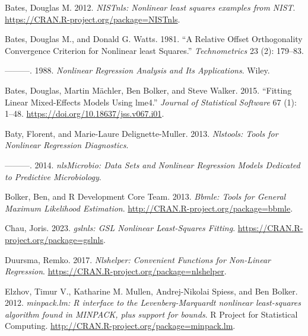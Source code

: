 \hypertarget{refs}{}
\begin{CSLReferences}{1}{0}
\leavevmode{}%
Bates, Douglas M. 2012. \emph{{NISTnls: Nonlinear least squares examples from NIST}}. \url{https://CRAN.R-project.org/package=NISTnls}.

\leavevmode{}%
Bates, Douglas M., and Donald G. Watts. 1981. {``{A Relative Offset Orthogonality Convergence Criterion for Nonlinear least Squares}.''} \emph{Technometrics} 23 (2): 179--83.

\leavevmode{}%
---------. 1988. \emph{{Nonlinear Regression Analysis and Its Applications}}. Wiley.

\leavevmode{}%
Bates, Douglas, Martin Mächler, Ben Bolker, and Steve Walker. 2015. {``Fitting Linear Mixed-Effects Models Using {lme4}.''} \emph{Journal of Statistical Software} 67 (1): 1--48. \url{https://doi.org/10.18637/jss.v067.i01}.

\leavevmode{}%
Baty, Florent, and Marie-Laure Delignette-Muller. 2013. \emph{Nlstools: Tools for Nonlinear Regression Diagnostics}.

\leavevmode{}%
---------. 2014. \emph{nlsMicrobio: Data Sets and Nonlinear Regression Models Dedicated to Predictive Microbiology}.

\leavevmode{}%
Bolker, Ben, and R Development Core Team. 2013. \emph{Bbmle: Tools for General Maximum Likelihood Estimation}. \url{http://CRAN.R-project.org/package=bbmle}.

\leavevmode{}%
Chau, Joris. 2023. \emph{{gslnls: GSL Nonlinear Least-Squares Fitting}}. \url{https://CRAN.R-project.org/package=gslnls}.

\leavevmode{}%
Duursma, Remko. 2017. \emph{Nlshelper: Convenient Functions for Non-Linear Regression}. \url{https://CRAN.R-project.org/package=nlshelper}.

\leavevmode{}%
Elzhov, Timur V., Katharine M. Mullen, Andrej-Nikolai Spiess, and Ben Bolker. 2012. \emph{{minpack.lm: R interface to the Levenberg-Marquardt nonlinear least-squares algorithm found in MINPACK, plus support for bounds}}. R Project for Statistical Computing. \url{http://CRAN.R-project.org/package=minpack.lm}.


\end{CSLReferences}
